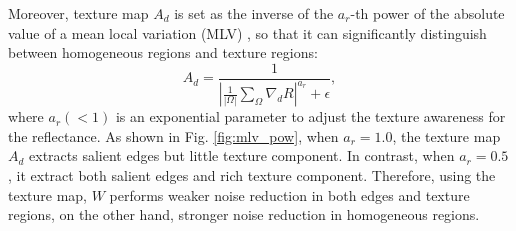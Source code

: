 Moreover, texture map $A_{d}$ is set as the inverse of the $a_{r}$-th power of the absolute value of a mean local variation (MLV) \cite{jiep}, so that it can significantly distinguish between homogeneous regions and texture regions:
\begin{equation}
A_{d} = \frac{1}{\left |\frac{1}{|\Omega|}\sum_{\Omega}\nabla_{d}{R} \right|^{a_{r}} + \epsilon}, \label{eq: mlv}
\end{equation}
where $a_{r} (< 1)$ is an exponential parameter to adjust the texture awareness for the reflectance.
As shown in Fig. \ref{fig:mlv_pow}, when $a_{r}=1.0$, the texture map $A_{d}$ extracts salient edges but little texture component. In contrast, when $a_{r}=0.5$, it extract both salient edges and rich texture component. Therefore, using the texture map, $W$ performs weaker noise reduction in both edges and texture regions, on the other hand, stronger noise reduction in homogeneous regions.
 
